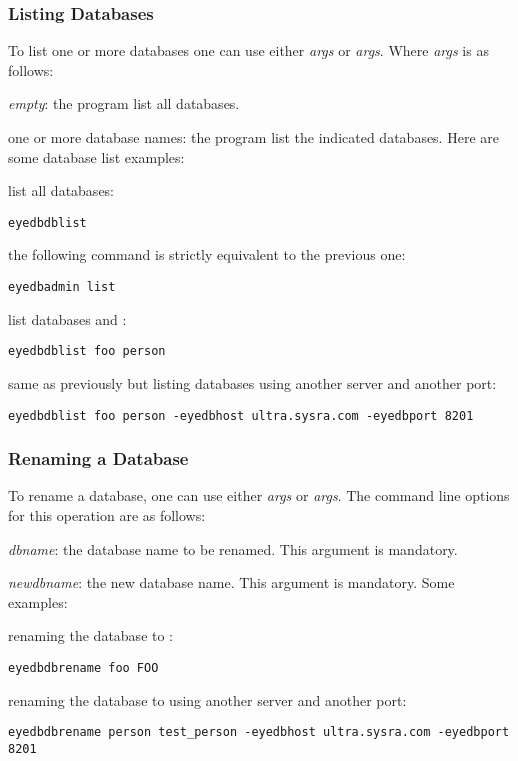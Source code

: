\subsubsection{Listing Databases}
To list one or more databases one can use either 
\emph{args}
or  \emph{args}.
Where \emph{args} is as follows:
\bi
\item \emph{empty}: the program list all databases.
\item one or more database names: the program list the indicated databases.
\ei
Here are some database list examples:
\bi
\item list all databases:
\verbsize
\begin{verbatim}
eyedbdblist
\end{verbatim}
\normalsize
\item the following command is strictly equivalent to the previous one:
\verbsize
\begin{verbatim}
eyedbadmin list
\end{verbatim}
\normalsize
\item list databases  and :
\verbsize
\begin{verbatim}
eyedbdblist foo person
\end{verbatim}
\normalsize
\item same as previously but listing databases using another server
and another port:
\verbsize
\begin{verbatim}
eyedbdblist foo person -eyedbhost ultra.sysra.com -eyedbport 8201
\end{verbatim}
\normalsize
\ei
\subsubsection{Renaming a Database}
To rename a database, one can use either 
\emph{args}
or  \emph{args}.
The command line options for this operation are as follows:
\bi
\item \emph{dbname}: the database name to be renamed. This argument is
mandatory.
\item \emph{newdbname}: the new database name.
This argument is mandatory.
\ei
Some examples:
\bi
\item renaming the database  to :
\verbsize
\begin{verbatim}
eyedbdbrename foo FOO
\end{verbatim}
\normalsize
\item renaming the database  to  using
another server and another port:
\verbsize
\begin{verbatim}
eyedbdbrename person test_person -eyedbhost ultra.sysra.com -eyedbport 8201
\end{verbatim}
\normalsize
\ei
